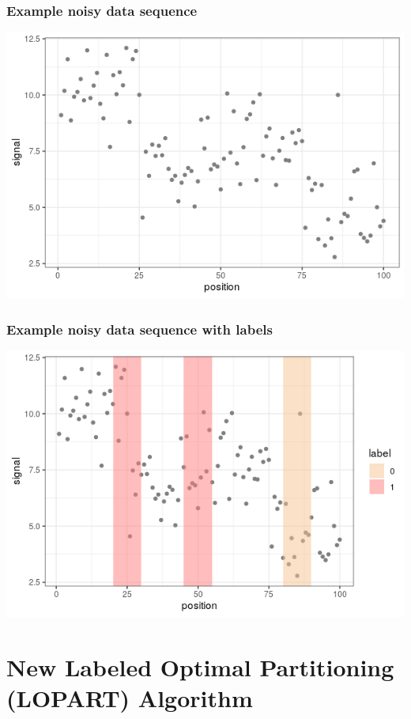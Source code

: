 \documentclass{beamer}
\begin{document}
\begin{frame}
  \frametitle{Example noisy data sequence}

  \includegraphics[width=\textwidth]{figure-baselines-data} 
  
\end{frame}

\begin{frame}
  \frametitle{Example noisy data sequence with labels}

  \includegraphics[width=\textwidth]{figure-baselines-labels}  
  
\end{frame}



\section{New Labeled Optimal Partitioning (LOPART) Algorithm}
\end{document}
